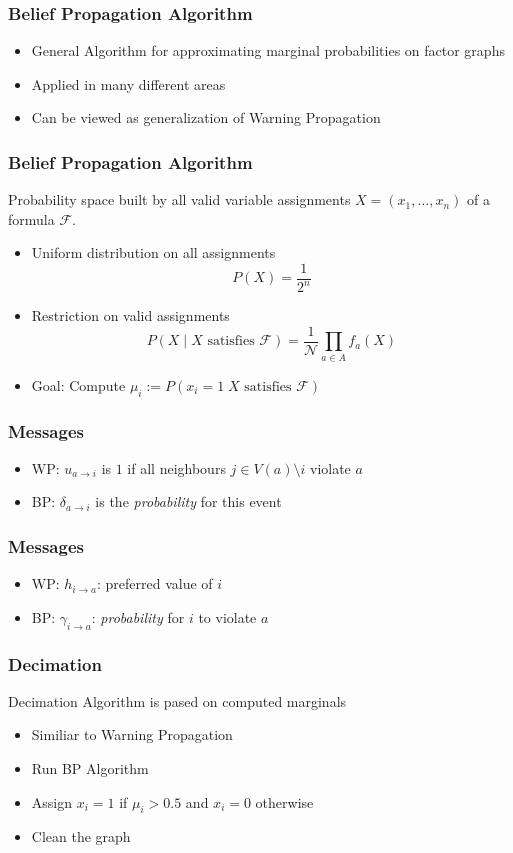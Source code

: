 \begin{frame}
	\frametitle{Belief Propagation Algorithm}
	\begin{itemize}
		\item General Algorithm for approximating marginal probabilities on factor graphs
		\item Applied in many different areas
		\item Can be viewed as generalization of Warning Propagation
	\end{itemize}
\end{frame}

\begin{frame}
	\frametitle{Belief Propagation Algorithm}
	Probability space built by all valid variable assignments $X = (x_1, \ldots, x_n)$ of a formula $\mathcal{F}$.
	\begin{itemize}
		\item Uniform distribution on all assignments 
		$$P(X) = \frac{1}{2^n}$$
		\item Restriction on valid assignments
	$$P(X \; | \; X \text{ satisfies } \mathcal{F}) = \frac{1}{\mathcal{N}} \prod_{a \in A} f_a(X)$$
	\item Goal: Compute $\mu_i := P(x_i = 1 \; X \text{ satisfies } \mathcal{F})$
	\end{itemize}
\end{frame}

\begin{frame}
	\frametitle{Messages}
	
	\begin{itemize}
		\item WP: $u_{a \rightarrow i}$ is $1$ if all neighbours $j \in V(a) \setminus i$ violate $a$
		\item BP: $\delta_{a \rightarrow i}$ is the \emph{probability} for this event
	\end{itemize}
	
	
\end{frame}

\begin{frame}
	\frametitle{Messages}
	
	\begin{itemize}
		\item WP: $h_{i \rightarrow a}$: preferred value of $i$
		\item BP: $\gamma_{i \rightarrow a}$: \emph{probability} for $i$ to violate $a$
	\end{itemize}
\end{frame}

\begin{frame}
	\frametitle{Decimation}
	Decimation Algorithm is pased on computed marginals
	\begin{itemize}
		\item Similiar to Warning Propagation
		\item Run BP Algorithm
		\item Assign $x_i = 1$ if $\mu_i > 0.5$ and $x_i = 0$ otherwise
		\item Clean the graph
	\end{itemize}
\end{frame}



